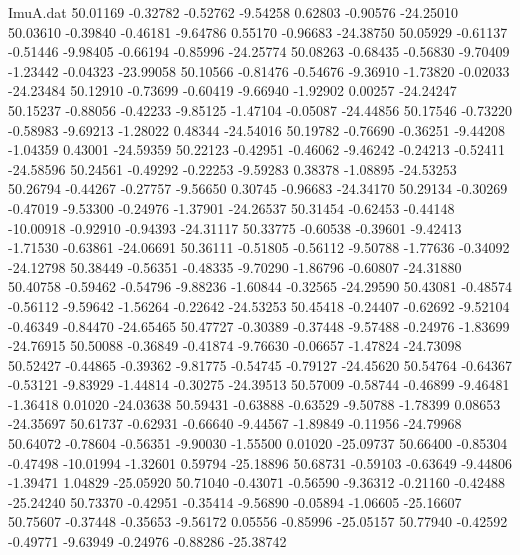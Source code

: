 \begin{filecontents}{ImuA.dat}
  50.01169   -0.32782   -0.52762   -9.54258    0.62803   -0.90576  -24.25010
  50.03610   -0.39840   -0.46181   -9.64786    0.55170   -0.96683  -24.38750
  50.05929   -0.61137   -0.51446   -9.98405   -0.66194   -0.85996  -24.25774
  50.08263   -0.68435   -0.56830   -9.70409   -1.23442   -0.04323  -23.99058
  50.10566   -0.81476   -0.54676   -9.36910   -1.73820   -0.02033  -24.23484
  50.12910   -0.73699   -0.60419   -9.66940   -1.92902    0.00257  -24.24247
  50.15237   -0.88056   -0.42233   -9.85125   -1.47104   -0.05087  -24.44856
  50.17546   -0.73220   -0.58983   -9.69213   -1.28022    0.48344  -24.54016
  50.19782   -0.76690   -0.36251   -9.44208   -1.04359    0.43001  -24.59359
  50.22123   -0.42951   -0.46062   -9.46242   -0.24213   -0.52411  -24.58596
  50.24561   -0.49292   -0.22253   -9.59283    0.38378   -1.08895  -24.53253
  50.26794   -0.44267   -0.27757   -9.56650    0.30745   -0.96683  -24.34170
  50.29134   -0.30269   -0.47019   -9.53300   -0.24976   -1.37901  -24.26537
  50.31454   -0.62453   -0.44148  -10.00918   -0.92910   -0.94393  -24.31117
  50.33775   -0.60538   -0.39601   -9.42413   -1.71530   -0.63861  -24.06691
  50.36111   -0.51805   -0.56112   -9.50788   -1.77636   -0.34092  -24.12798
  50.38449   -0.56351   -0.48335   -9.70290   -1.86796   -0.60807  -24.31880
  50.40758   -0.59462   -0.54796   -9.88236   -1.60844   -0.32565  -24.29590
  50.43081   -0.48574   -0.56112   -9.59642   -1.56264   -0.22642  -24.53253
  50.45418   -0.24407   -0.62692   -9.52104   -0.46349   -0.84470  -24.65465
  50.47727   -0.30389   -0.37448   -9.57488   -0.24976   -1.83699  -24.76915
  50.50088   -0.36849   -0.41874   -9.76630   -0.06657   -1.47824  -24.73098
  50.52427   -0.44865   -0.39362   -9.81775   -0.54745   -0.79127  -24.45620
  50.54764   -0.64367   -0.53121   -9.83929   -1.44814   -0.30275  -24.39513
  50.57009   -0.58744   -0.46899   -9.46481   -1.36418    0.01020  -24.03638
  50.59431   -0.63888   -0.63529   -9.50788   -1.78399    0.08653  -24.35697
  50.61737   -0.62931   -0.66640   -9.44567   -1.89849   -0.11956  -24.79968
  50.64072   -0.78604   -0.56351   -9.90030   -1.55500    0.01020  -25.09737
  50.66400   -0.85304   -0.47498  -10.01994   -1.32601    0.59794  -25.18896
  50.68731   -0.59103   -0.63649   -9.44806   -1.39471    1.04829  -25.05920
  50.71040   -0.43071   -0.56590   -9.36312   -0.21160   -0.42488  -25.24240
  50.73370   -0.42951   -0.35414   -9.56890   -0.05894   -1.06605  -25.16607
  50.75607   -0.37448   -0.35653   -9.56172    0.05556   -0.85996  -25.05157
  50.77940   -0.42592   -0.49771   -9.63949   -0.24976   -0.88286  -25.38742

\end{filecontents}
